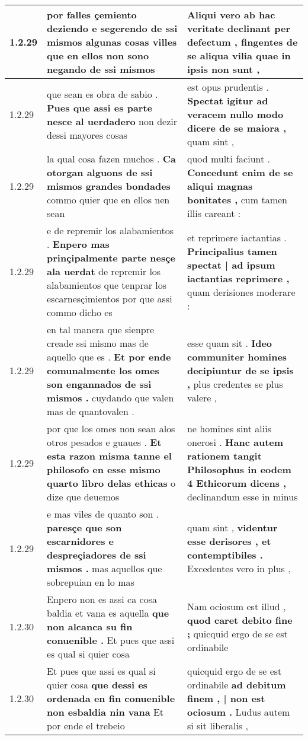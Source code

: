\begin{tabular}{|p{1cm}|p{6.5cm}|p{6.5cm}|}
1.2.29 & por falles çemiento deziendo \textbf{ e segerendo de ssi mismos algunas cosas villes } que en ellos non sono negando de ssi mismos & Aliqui vero ab hac veritate declinant per defectum , \textbf{ fingentes de se aliqua vilia } quae in ipsis non sunt , \\\hline
1.2.29 & que sean es obra de sabio . \textbf{ Pues que assi es parte nesce al uerdadero } non dezir dessi mayores cosas & est opus prudentis . \textbf{ Spectat igitur ad veracem nullo modo dicere de se maiora , } quam sint , \\\hline
1.2.29 & la qual cosa fazen muchos . \textbf{ Ca otorgan alguons de ssi mismos grandes bondades } commo quier que en ellos nen sean & quod multi faciunt . \textbf{ Concedunt enim de se aliqui magnas bonitates , } cum tamen illis careant : \\\hline
1.2.29 & e de repremir los alabamientos . \textbf{ Enpero mas prinçipalmente parte nesçe ala uerdat } de repremir los alabamientos que tenprar los escarnesçimientos por que assi commo dicho es & et reprimere iactantias . \textbf{ Principalius tamen spectat | ad ipsum iactantias reprimere , } quam derisiones moderare : \\\hline
1.2.29 & en tal manera que sienpre creade ssi mismo mas de aquello que es . \textbf{ Et por ende comunalmente los omes son engannados de ssi mismos . } cuydando que valen mas de quantovalen . & esse quam sit . \textbf{ Ideo communiter homines decipiuntur de se ipsis , } plus credentes se plus valere , \\\hline
1.2.29 & por que los omes non sean alos otros pesados e guaues . \textbf{ Et esta razon misma tanne el philosofo en esse mismo quarto libro delas ethicas } o dize que deuemos & ne homines sint aliis onerosi . \textbf{ Hanc autem rationem tangit Philosophus in eodem 4 Ethicorum dicens , } declinandum esse in minus \\\hline
1.2.29 & e mas viles de quanto son . \textbf{ paresçe que son escarnidores e despreçiadores de ssi mismos . } mas aquellos que sobrepuian en lo mas & quam sint , \textbf{ videntur esse derisores , et contemptibiles . } Excedentes vero in plus , \\\hline
1.2.30 & Enpero non es assi ca cosa baldia et vana es aquella \textbf{ que non alcanca su fin conuenible . } Et pues que assi es qual si quier cosa & Nam ociosum est illud , \textbf{ quod caret debito fine ; } quicquid ergo de se est ordinabile \\\hline
1.2.30 & Et pues que assi es qual si quier cosa \textbf{ que dessi es ordenada en fin conuenible non esbaldia nin vana } Et por ende el trebeio & quicquid ergo de se est ordinabile \textbf{ ad debitum finem , | non est ociosum . } Ludus autem si sit liberalis , \\\hline

\end{tabular}
